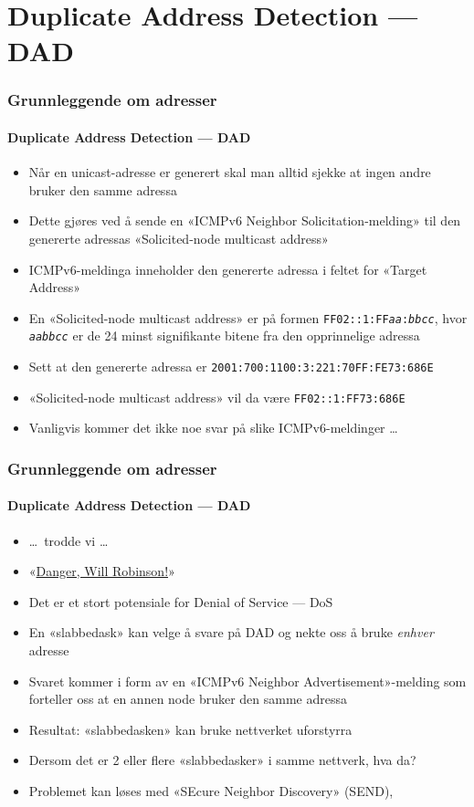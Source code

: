 \section{Duplicate Address Detection --- DAD}
\begin{frame}%
  \frametitle{Grunnleggende om adresser}
  \framesubtitle{Duplicate Address Detection --- DAD}
  \pause
  \begin{itemize}[<+->]
  \item Når en unicast-adresse er generert skal man alltid sjekke at
    ingen andre bruker den samme adressa\hfill{}
  \item Dette gjøres ved å sende en «ICMPv6 Neighbor
    Solicitation-melding» til den genererte adressas «Solicited-node
    multicast address»
  \item ICMPv6-meldinga inneholder den genererte adressa i feltet for
    «Target Address»\hfill{}
  \item En «Solicited-node multicast address» er på formen
    \texttt{FF02::1:FF\alert<8->{\textit{aa}}:\alert<8->{\textit{bbcc}}},
    hvor \alert<8->{\texttt{\textit{aabbcc}}} er de 24 minst
    signifikante bitene fra den opprinnelige adressa\hfill{}
  \item Sett at den genererte adressa er
    \texttt{2001:700:1100:3:221:70FF:FE\alert<8->{73}:\alert<8->{686E}}
  \item «Solicited-node multicast address» vil da være
    \texttt{FF02::1:FF\alert<8->{73}:\alert<8->{686E}}
  \pause
  \item Vanligvis kommer det ikke noe svar på slike ICMPv6-meldinger
    \dots
  \end{itemize}
\end{frame}

\begin{frame}%
  \frametitle{Grunnleggende om adresser}
  \framesubtitle{Duplicate Address Detection --- DAD}
  \begin{itemize}[<+->]
  \item \dots\ trodde vi \dots
  \item «\href{http://en.wikipedia.org/wiki/Danger,_Will_Robinson}{Danger, Will Robinson!}»
  \item Det er et stort potensiale for Denial of Service --- DoS\hfill{}
  \item En «slabbedask» kan velge å svare på DAD og nekte oss å bruke
    \textit{enhver\/} adresse
  \item Svaret kommer i form av en «ICMPv6 Neighbor
    Advertisement»-melding som forteller oss at en annen node bruker
    den samme adressa\hfill{}
  \item Resultat: «slabbedasken» kan bruke nettverket uforstyrra
  \item Dersom det er 2 eller flere «slabbedasker» i samme nettverk, hva da?
  \item Problemet kan løses med «SEcure Neighbor Discovery» (SEND), 
  \end{itemize}
\end{frame}

